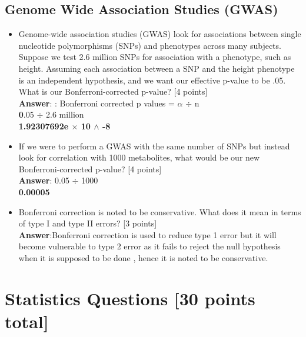 \documentclass{article}
\begin{document}
\subsection{Genome Wide Association Studies (GWAS)}
\begin{itemize}
    \item Genome-wide association studies (GWAS) look for associations between single nucleotide polymorphisms (SNPs) and
phenotypes across many subjects. Suppose we test 2.6 million SNPs for association with a phenotype,
such as height. Assuming each association between a SNP and the height phenotype is an
independent hypothesis, and we want our effective p-value to be .05. What is our Bonferroni-corrected
p-value? [4 points] \\
\textbf{Answer}: : Bonferroni corrected p values = $\alpha$ $\div$  n\ \\
\textbf 0.05 $\div$ 2.6 million \\
\textbf {1.92307692e $\times$ 10 $\wedge$ -8}
\item If we were to perform a GWAS with the same number of SNPs but instead look for correlation
with 1000 metabolites, what would be our new Bonferroni-corrected p-value? [4 points]\\
\textbf{Answer}: 0.05 $\div$ 1000 \\
\textbf {0.00005} \\

\item Bonferroni correction is noted to be conservative. What does it mean in terms of type I and
type II errors? [3 points] \\

\textbf{Answer}:Bonferroni correction is used to reduce type 1 error but it will become vulnerable to type 2
 error as it fails to reject the null hypothesis when it is supposed to be done , hence it is
 noted to be conservative.\\

\end{itemize}

\section{Statistics Questions [30 points total]}
\end{document}
